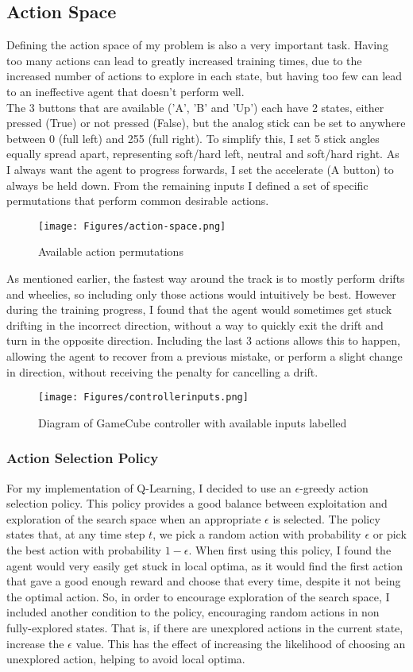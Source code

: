 \subsection{Action Space}
Defining the action space of my problem is also a very important task. Having too many actions can lead to greatly increased training times, due to the increased number of actions to explore in each state, but having too few can lead to an ineffective agent that doesn't perform well. \\The 3 buttons that are available ('A', 'B' and 'Up') each have 2 states, either pressed (True) or not pressed (False), but the analog stick can be set to anywhere between 0 (full left) and 255 (full right). To simplify this, I set 5 stick angles equally spread apart, representing soft/hard left, neutral and soft/hard right. As I always want the agent to progress forwards, I set the accelerate (A button) to always be held down. From the remaining inputs I defined a set of specific permutations that perform common desirable actions.
\begin{figure}[hbt]
    \centering
    \texttt{[image: Figures/action-space.png]}
    \caption{Available action permutations}
    \label{fig:action-space}
\end{figure}
As mentioned earlier, the fastest way around the track is to mostly perform drifts and wheelies, so including only those actions would intuitively be best. However during the training progress, I found that the agent would sometimes get stuck drifting in the incorrect direction, without a way to quickly exit the drift and turn in the opposite direction. Including the last 3 actions allows this to happen, allowing the agent to recover from a previous mistake, or perform a slight change in direction, without receiving the penalty for cancelling a drift.
\begin{figure}[htb]
    \centering
    \texttt{[image: Figures/controllerinputs.png]}
    \caption{Diagram of GameCube controller with available inputs labelled}
    \label{fig:laballed-gc-diagram}
\end{figure}
\subsubsection{Action Selection Policy}
\label{sec:eps-greedy}
For my implementation of Q-Learning, I decided to use an $\epsilon$-greedy action selection policy. This policy provides a good balance between exploitation and exploration of the search space when an appropriate $\epsilon$ is selected. The policy states that, at any time step $t$, we pick a random action with probability $\epsilon$ or pick the best action with probability $1-\epsilon$. When first using this policy, I found the agent would very easily get stuck in local optima, as it would find the first action that gave a good enough reward and choose that every time, despite it not being the optimal action. So, in order to encourage exploration of the search space, I included another condition to the policy, encouraging random actions in non fully-explored states. That is, if there are unexplored actions in the current state, increase the $\epsilon$ value. This has the effect of increasing the likelihood of choosing an unexplored action, helping to avoid local optima.
